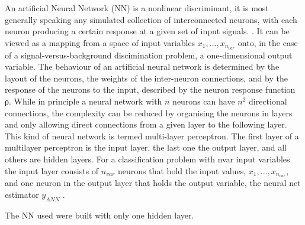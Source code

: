 An artificial Neural Network (NN) is a nonlinear discriminant, it is most generally speaking any simulated collection of interconnected neurons, with each neuron producing a certain response at a given set of input signals.
. It can be viewed as a mapping from a space of input variables $x_1,...,x_{n_{var}}$ onto, in the case of a signal-versus-background discimination problem, a one-dimensional output variable. The behaviour of an artificial neural network is determined by the layout of the neurons, the weights of the inter-neuron connections, and by the response of the neurons to the input, described by the neuron response function ρ.
While in principle a neural network with $n$ neurons can have $n^2$ directional connections, the complexity can be reduced by organising the neurons in layers and only allowing direct connections from a given layer to the following layer. This kind of neural network is termed multi-layer perceptron. The first layer of a multilayer perceptron is the input layer, the last one the output layer, and all others are hidden layers. For a classification problem with nvar input variables the input layer consists of $n_{var}$ neurons that hold the input values, $x_1,...,x_{n_{var}}$, and one neuron in the output layer that holds the output variable, the neural net estimator $y_{ANN}$ .


The NN used were built with only one hidden layer. %


